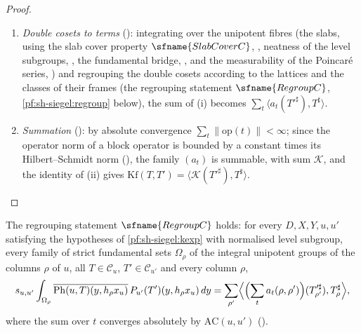 \begin{proof}
\begin{enumerate}[label=(\roman*)]
\item \emph{Double cosets to terms} (): integrating over the
unipotent fibres (the slabs, using the slab cover property $\sfname{SlabCoverC}$, ,
neatness of the level subgroups, , the fundamental bridge,
, and the measurability of the Poincar\'e series,
) and regrouping the double cosets according to the lattices and the classes
of their frames (the regrouping statement $\sfname{RegroupC}$, \cref{pf:sh-siegel:regroup} below), the sum of
\textup{(i)} becomes $\sum_t\langle a_t(T'^\sharp),T^\sharp\rangle$.
\item \emph{Summation} (): by absolute convergence
$\sum_t\|\mathrm{op}(t)\|<\infty$; since the operator norm of a block operator is bounded by a constant times its
Hilbert--Schmidt norm (), the family $(a_t)$ is summable, with
sum $\mathcal K$, and the identity of (ii) gives $\mathrm{Kf}(T,T')=\langle\mathcal K(T'^\sharp),T^\sharp\rangle$.\qedhere
\end{enumerate}
\end{proof}

\begin{proposition}[Regrouping]\label{pf:sh-siegel:regroup}
The regrouping statement $\sfname{RegroupC}$ holds: for every $D,X,Y,u,u'$ satisfying the hypotheses of
\cref{pf:sh-siegel:kexp} with normalised level subgroup, every family of strict fundamental sets $\Omega_\rho$ of the integral
unipotent groups of the columns $\rho$ of $u$, all $T\in\mathcal C_u$, $T'\in\mathcal C_{u'}$ and every column $\rho$,
\[
s_{u,u'}\int_{\Omega_\rho}\overline{\mathrm{Ph}(u,T)(y,h_\rho x_u)}\,P_{u'}(T')(y,h_\rho x_u)\,dy
=\sum_{\rho'}\Bigl\langle\Bigl(\sum_ta_t(\rho,\rho')\Bigr)(T'^\sharp_{\rho'}),T^\sharp_\rho\Bigr\rangle ,
\]
where the sum over $t$ converges absolutely by $\mathrm{AC}(u,u')$
().
\end{proposition}

